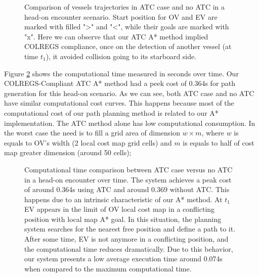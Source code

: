         \begin{figure}[H]
            \centering
            
            \caption{Comparison of vessels trajectories in \ac{ATC} case and no \ac{ATC} in a head-on encounter scenario. Start position for \ac{OV} and \ac{EV} are marked with filled ">" and "<", while their goals are marked with "x". Here we can observe that our \ac{ATC} A* method implied COLREGS compliance, once on the detection of another vessel (at time $t_1$), it avoided collision going to its starboard side.}
            \label{fig:plot_ho_w_vs_wo}
        \end{figure}
        
        Figure \ref{fig:plot_ho_w_vs_wo_CT} shows the computational time measured in seconds over time. Our COLREGS-Compliant \ac{ATC} A* method had a peek cost of 0.364s for path generation for this head-on scenario. As we can see, both \ac{ATC} case and no \ac{ATC} have similar computational cost curves. This happens because most of the computational cost of our path planning method is related to our A* implementation. The \ac{ATC} method alone has low computational consumption. In the worst case the need is to fill a grid area of dimension $w \times m$, where $w$ is equals to \ac{OV}'s width (2 local cost map grid cells) and $m$ is equals to half of cost map greater dimension (around 50 cells);
        \begin{figure}[H]
            \centering
            
            \caption{Computational time comparison between \ac{ATC} case versus no \ac{ATC} in a head-on encounter over time. The system achieves a peak cost of around 0.364s using \ac{ATC} and around 0.369 without \ac{ATC}. This happens due to an intrinsic characteristic of our A* method. At $t_1$ \ac{EV} appears in the limit of \ac{OV} local cost map in a conflicting position with local map A* goal. In this situation, the planning system searches for the nearest free position and define a path to it. After some time, \ac{EV} is not anymore in a conflicting position, and the computational time reduces dramatically. Due to this behavior, our system presents a low average execution time around 0.074s when compared to the maximum computational time.}
            \label{fig:plot_ho_w_vs_wo_CT}
        \end{figure}
        
